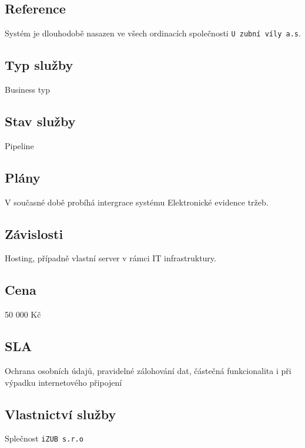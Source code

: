 \documentclass[12pt, a4paper, titlepage]{article}
\begin{document}
	\subsection*{Reference}
	Systém je dlouhodobě nasazen ve všech ordinacích společnosti \texttt{U zubní víly a.s}.

	\subsection*{Typ služby}
	Business typ

	\subsection*{Stav služby}
	Pipeline

	\subsection*{Plány}
	V současné době probíhá intergrace systému Elektronické evidence tržeb.

	\subsection*{Závislosti}
	Hosting, případně vlastní server v rámci IT infrastruktury.

	\subsection*{Cena}
	50 000 Kč

	\subsection*{SLA}
	Ochrana osobních údajů, pravidelné zálohování dat, částečná funkcionalita i při výpadku internetového připojení

	\subsection*{Vlastnictví služby}
	Splečnost \texttt{iZUB s.r.o}
\end{document}
